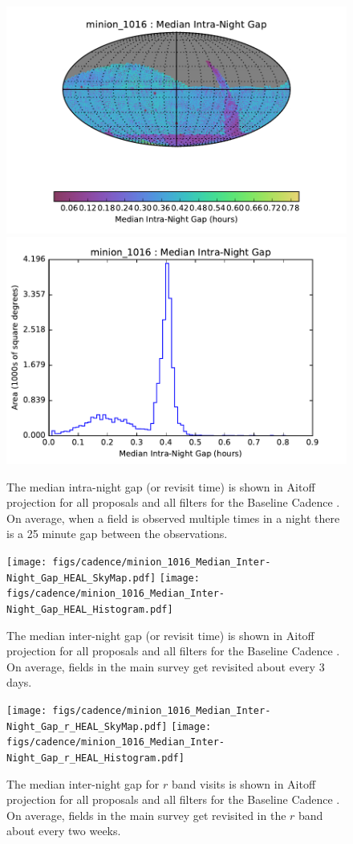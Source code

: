 \begin{figure}[t!]
\vskip -0.0in
\includegraphics[angle=0,width=0.49\hsize,clip]{figs/cadence/minion_1016_Median_Intra-Night_Gap_HEAL_SkyMap.pdf}
\includegraphics[angle=0,width=0.49\hsize,clip]{figs/cadence/minion_1016_Median_Intra-Night_Gap_HEAL_Histogram.pdf}
\vskip -0.1in
\caption{The median intra-night gap (or revisit time) is shown in Aitoff projection
for all proposals and all filters for the Baseline Cadence .
On average, when a field is observed multiple times in a night there is a 25 minute gap between the observations.}
\label{fig:enigmaInterGapAll}
\end{figure}


\begin{figure}[t!]
\vskip -0.0in
\texttt{[image: figs/cadence/minion\_1016\_Median\_Inter-Night\_Gap\_HEAL\_SkyMap.pdf]}
\texttt{[image: figs/cadence/minion\_1016\_Median\_Inter-Night\_Gap\_HEAL\_Histogram.pdf]}
\vskip -0.1in
\caption{The median inter-night gap (or revisit time) is shown in Aitoff projection
for all proposals and all filters for the Baseline Cadence .
On average, fields in the main survey get revisited about every 3 days.}
\label{fig:enigmaGapAll}
\end{figure}

\begin{figure}[h!]
\vskip -0.0in
\texttt{[image: figs/cadence/minion\_1016\_Median\_Inter-Night\_Gap\_r\_HEAL\_SkyMap.pdf]}
\texttt{[image: figs/cadence/minion\_1016\_Median\_Inter-Night\_Gap\_r\_HEAL\_Histogram.pdf]}
\vskip -0.1in
\caption{The median inter-night gap for $r$ band visits is shown in Aitoff projection
for all proposals and all filters for the Baseline Cadence .
On average, fields in the main survey get revisited in the $r$ band about every two weeks.}
\label{fig:enigmaGapr}
\end{figure}

